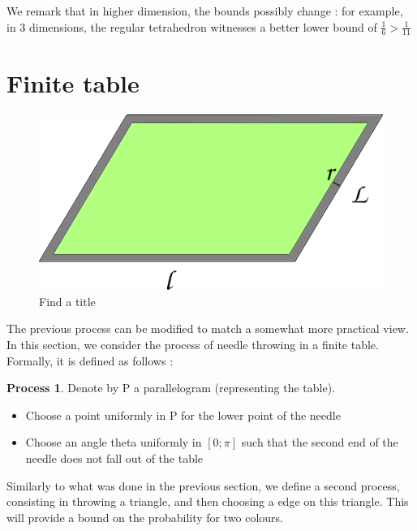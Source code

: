 \documentclass[a4paper,11pt]{article}
\theoremstyle{definition}
\newtheorem{process}{Process}
\theoremstyle{remark}
\begin{document}
We remark that in higher dimension, the bounds possibly change : for
example, in 3 dimensions, the regular tetrahedron witnesses a better lower bound
of $\frac 1 6 >\frac 1 {11}$   

\section{Finite table}

\begin{figure}[h]
\center
\includegraphics[scale=0.5]{tablefinie.png}
\caption{\label{tablefinie} Find a title}
\end{figure}
The previous process can be modified to match a somewhat more practical view. In this section, we consider the process of needle throwing in a finite table. 
Formally, it is defined as follows :
\begin{process}
Denote by P a parallelogram (representing the table). 
\begin{itemize}
\item Choose a point uniformly in P for the lower point of the needle
\item Choose an angle theta uniformly in $[0 ; \pi]$ such that the second end of the needle does not fall out of the table
\end{itemize}
\end{process}

Similarly to what was done in the previous section, we define a second process, consisting in throwing a triangle, and then choosing a edge on this triangle.
This will provide a bound on the probability for two colours.
\end{document}
